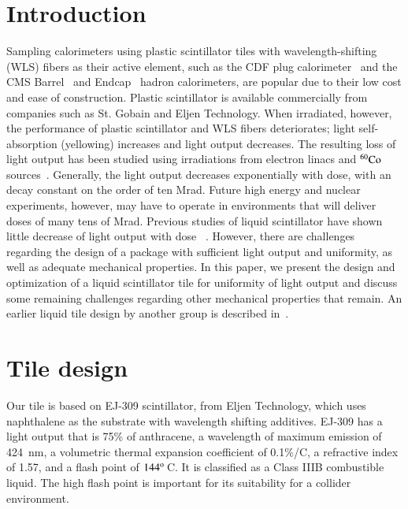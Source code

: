 \documentclass[review]{elsarticle}
\begin{document}
\linenumbers

\section{Introduction}
Sampling calorimeters using plastic scintillator tiles with
wavelength-shifting (WLS) fibers as their active element, such as the CDF plug
calorimeter~\cite{Aota1995557} and the CMS Barrel~\cite{CMSHB} and
Endcap~\cite{HCALTDR1997} hadron calorimeters, are popular due to their
low cost and ease of construction. Plastic scintillator is available
commercially from companies such as St. Gobain and Eljen Technology. When
irradiated, however, the performance of plastic scintillator and WLS
fibers deteriorates; light self-absorption (yellowing) increases and
light output decreases. The resulting loss of light output 
has been studied using irradiations
from electron linacs and ${\rm ^{60}Co}$ sources~\cite{vasken,ByonWagner1993263}.
Generally, the light output decreases exponentially with dose, with an
decay constant on the order of ten Mrad. Future high energy and nuclear
experiments, however, may have to operate in environments that will
deliver doses of many tens of Mrad.
Previous studies of liquid scintillator have shown little decrease
of light output with dose ~\cite{zornliquid,Klein1967399,berlman}.
However, there are challenges regarding the design of a package
with sufficient light output and uniformity, as well as 
adequate mechanical properties.
In this paper, we present the design
and optimization of a liquid scintillator tile for uniformity
of light output and discuss some remaining challenges regarding
other mechanical properties that remain.
An earlier liquid tile design by another group is described in~\cite{liquidrandy}.

\section{Tile design}
\label{sec:design}
Our tile is based on EJ-309 scintillator, from Eljen Technology, which
uses naphthalene as the substrate with wavelength shifting additives.
EJ-309 has a light output that is 75\% of anthracene, a wavelength of
maximum emission of 424~nm, a volumetric thermal expansion coefficient
of 0.1\%/C,
a refractive index of 1.57, and a flash
point of $\rm{144^o}$\,C. It is classified as a Class IIIB combustible liquid.
The high flash point is important for its
suitability for a collider environment.
\end{document}
